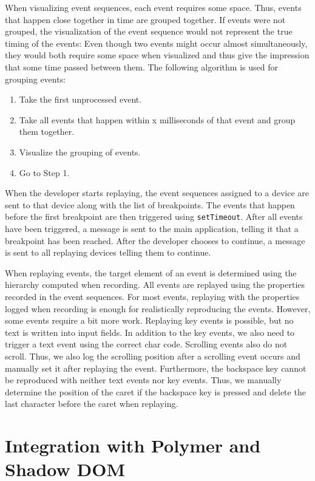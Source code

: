 When visualizing event sequences, each event requires some space. Thus, events that happen close together in time are grouped together. If events were not grouped, the visualization of the event sequence would not represent the true timing of the events: Even though two events might occur almost simultaneously, they would both require some space when visualized and thus give the impression that some time passed between them. The following algorithm is used for grouping events:
\begin{enumerate}
	\item Take the first unprocessed event.
	\item Take all events that happen within x milliseconds of that event and group them together.
	\item Visualize the grouping of events.
	\item Go to Step 1.
\end{enumerate}

When the developer starts replaying, the event sequences assigned to a device are sent to that device along with the list of breakpoints. The events that happen before the first breakpoint are then triggered using \lstinline|setTimeout|. After all events have been triggered, a message is sent to the main application, telling it that a breakpoint has been reached. After the developer chooses to continue, a message is sent to all replaying devices telling them to continue.

When replaying events, the target element of an event is determined using the hierarchy computed when recording. All events are replayed using the properties recorded in the event sequences. For most events, replaying with the properties logged when recording is enough for realistically reproducing the events. However, some events require a bit more work. Replaying key events is possible, but no text is written into input fields. In addition to the key events, we also need to trigger a text event using the correct char code. Scrolling events also do not scroll. Thus, we also log the scrolling position after a scrolling event occurs and manually set it after replaying the event. Furthermore, the backspace key cannot be reproduced with neither text events nor key events. Thus, we manually determine the position of the caret if the backspace key is pressed and delete the last character before the caret when replaying. 

\section{Integration with Polymer and Shadow DOM}

